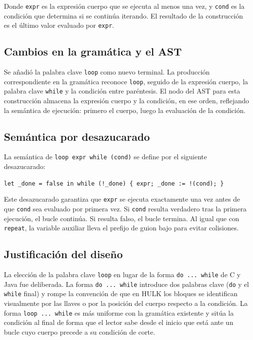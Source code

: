 \documentclass[12pt, a4paper]{article}
\begin{document}
Donde \texttt{expr} es la expresión cuerpo que se ejecuta al menos una vez, y \texttt{cond} es la condición que determina si se continúa iterando. El resultado de la construcción es el último valor evaluado por \texttt{expr}.

\subsection{Cambios en la gramática y el AST}

Se añadió la palabra clave \texttt{loop} como nuevo terminal. La producción correspondiente en la gramática reconoce \texttt{loop}, seguido de la expresión cuerpo, la palabra clave \texttt{while} y la condición entre paréntesis. El nodo del AST para esta construcción almacena la expresión cuerpo y la condición, en ese orden, reflejando la semántica de ejecución: primero el cuerpo, luego la evaluación de la condición.

\subsection{Semántica por desazucarado}

La semántica de \texttt{loop~expr~while~(cond)} se define por el siguiente desazucarado:

\begin{center}
\texttt{let \_done = false in while (!\_done) \{ expr; \_done := !(cond); \}}
\end{center}

Este desazucarado garantiza que \texttt{expr} se ejecuta exactamente una vez antes de que \texttt{cond} sea evaluado por primera vez. Si \texttt{cond} resulta verdadero tras la primera ejecución, el bucle continúa. Si resulta falso, el bucle termina. Al igual que con \texttt{repeat}, la variable auxiliar lleva el prefijo de guion bajo para evitar colisiones.

\subsection{Justificación del diseño}

La elección de la palabra clave \texttt{loop} en lugar de la forma \texttt{do~...~while} de C y Java fue deliberada. La forma \texttt{do~...~while} introduce dos palabras clave (\texttt{do} y el \texttt{while} final) y rompe la convención de que en HULK los bloques se identifican visualmente por las llaves o por la posición del cuerpo respecto a la condición. La forma \texttt{loop~...~while} es más uniforme con la gramática existente y sitúa la condición al final de forma que el lector sabe desde el inicio que está ante un bucle cuyo cuerpo precede a su condición de corte.
\end{document}
